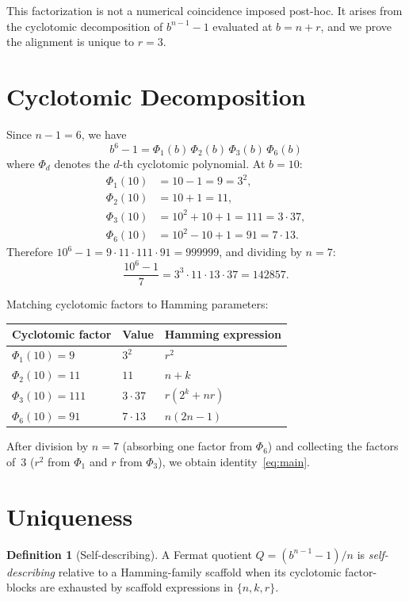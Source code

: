 \documentclass[11pt]{article}
\theoremstyle{definition}
\newtheorem{definition}{Definition}
\theoremstyle{remark}
\begin{document}
This factorization is not a numerical coincidence imposed
post-hoc. It arises from the cyclotomic decomposition of
$b^{n-1}-1$ evaluated at $b=n+r$, and we prove the alignment
is unique to $r=3$.

\section{Cyclotomic Decomposition}

Since $n-1=6$, we have
\[
b^6-1 = \Phi_1(b)\,\Phi_2(b)\,\Phi_3(b)\,\Phi_6(b)
\]
where $\Phi_d$ denotes the $d$-th cyclotomic polynomial. At $b=10$:
\begin{align}
\Phi_1(10) &= 10-1 = 9 = 3^2, \\
\Phi_2(10) &= 10+1 = 11, \\
\Phi_3(10) &= 10^2+10+1 = 111 = 3 \cdot 37, \\
\Phi_6(10) &= 10^2-10+1 = 91 = 7 \cdot 13.
\end{align}
Therefore $10^6-1 = 9 \cdot 11 \cdot 111 \cdot 91 = 999999$,
and dividing by $n=7$:
\[
\frac{10^6-1}{7} = 3^3 \cdot 11 \cdot 13 \cdot 37 = 142857.
\]

Matching cyclotomic factors to Hamming parameters:
\begin{center}
\begin{tabular}{lll}
\hline
Cyclotomic factor & Value & Hamming expression \\
\hline
$\Phi_1(10) = 9$ & $3^2$ & $r^2$ \\
$\Phi_2(10) = 11$ & $11$ & $n+k$ \\
$\Phi_3(10) = 111$ & $3 \cdot 37$ & $r(2^k+nr)$ \\
$\Phi_6(10) = 91$ & $7 \cdot 13$ & $n(2n-1)$ \\
\hline
\end{tabular}
\end{center}
After division by $n=7$ (absorbing one factor from $\Phi_6$) and
collecting the factors of~$3$ ($r^2$ from $\Phi_1$ and $r$ from
$\Phi_3$), we obtain identity~\eqref{eq:main}.

\section{Uniqueness}

\begin{definition}[Self-describing]
A Fermat quotient $Q = (b^{n-1}-1)/n$ is \emph{self-describing}
relative to a Hamming-family scaffold when its cyclotomic
factor-blocks are exhausted by scaffold expressions in $\{n,k,r\}$.
\end{definition}
\end{document}
